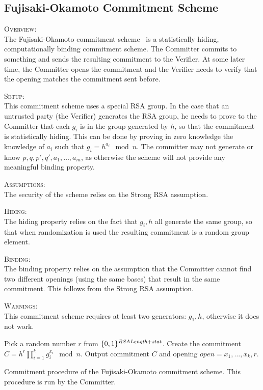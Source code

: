 \subsection{Fujisaki-Okamoto Commitment Scheme}

\textsc{Overview}:\\
The Fujisaki-Okamoto commitment scheme~\cite{fo:statistical-zk:c97,df:commitment:ac02} is a statistically hiding, computationally binding commitment scheme. The Committer commits to something and sends the resulting commitment to the Verifier. At some later time, the Committer opens the commitment and the Verifier needs to verify that the opening matches the commitment sent before.


\textsc{Setup}:\\
This commitment scheme uses a special RSA group.  In the case that an untrusted party (\eg the Verifier) generates the RSA group, he needs to prove to the Committer that each $g_i$ is in the group generated by $h$, so that the commitment is statistically hiding. This can be done by proving in zero knowledge the knowledge of $a_i$ such that $g_i = h^{a_i} \mod n$. The committer may not generate or know $p, q, p', q', a_1,\ldots,a_m$, as otherwise the scheme will not provide any meaningful binding property.


\textsc{Assumptions}:\\
The security of the scheme relies on the Strong RSA assumption.


\textsc{Hiding}:\\
The hiding property relies on the fact that $g_i,h$ all generate the same group, so that when randomization is used the resulting commitment is a random group element.


\textsc{Binding}:\\
The binding property relies on the assumption that the Committer cannot find two different openings (using the same bases) that result in the same commitment. This follows from the Strong RSA assumption.


\textsc{Warnings}:\\
This commitment scheme requires at least two generators: $g_1,h$, otherwise it does not work.



\begin{algorithm}[H]\label{commitFO}
\dontprintsemicolon

\BlankLine

 \;
\Indp
  Pick a random number $r$ from $\{0,1\}^{\mathit{RSALength} + \mathit{stat}}$. \;
  Create the commitment $C = h^r \prod_{i=1}^{k} g_i^{x_i} \mod n$. \;
  Output commitment $C$ and opening $open = x_1,\ldots,x_k,r$. \;
\Indm

\caption{Commitment procedure of the Fujisaki-Okamoto commitment scheme. This procedure is run by the Committer.}
\end{algorithm}


